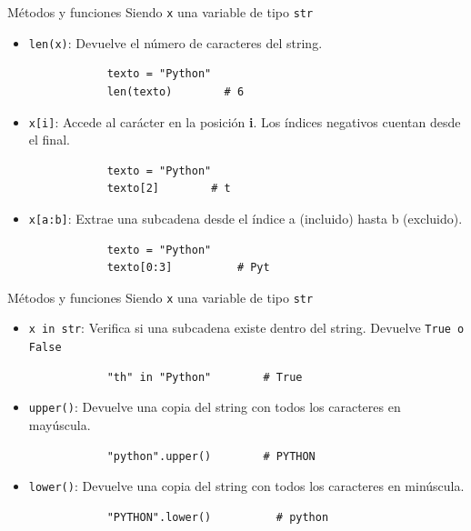 \documentclass{beamer}
\begin{document}
    \begin{frame}[fragile,t]{Métodos y funciones}
        Siendo \texttt{x} una variable de tipo \texttt{str}
        \begin{itemize}
            \item \texttt{len(x)}: Devuelve el número de caracteres del string.
            \begin{verbatim}   
            texto = "Python"
            len(texto)        # 6
            \end{verbatim}
            \item \texttt{x[i]}: Accede al carácter en la posición \textbf{i}. Los índices negativos cuentan desde el final.
            \begin{verbatim}
            texto = "Python"
            texto[2]        # t
            \end{verbatim}
            \item \texttt{x[a:b]}: Extrae una subcadena desde el índice a (incluido) hasta b (excluido).
            \begin{verbatim}
            texto = "Python"
            texto[0:3]          # Pyt
            \end{verbatim}
        \end{itemize}
    \end{frame}

    \begin{frame}[fragile,t]{Métodos y funciones}
        Siendo \texttt{x} una variable de tipo \texttt{str}
        \begin{itemize}
            \item \texttt{x in str}: Verifica si una subcadena existe dentro del string. Devuelve \texttt{True o False}
            \begin{verbatim}
            "th" in "Python"        # True
            \end{verbatim}
            \item \texttt{upper()}: Devuelve una copia del string con todos los caracteres en mayúscula.
            \begin{verbatim}
            "python".upper()        # PYTHON
            \end{verbatim}
            \item \texttt{lower()}: Devuelve una copia del string con todos los caracteres en minúscula.
            \begin{verbatim}
            "PYTHON".lower()          # python
            \end{verbatim}
        \end{itemize}
    \end{frame}
\end{document}
